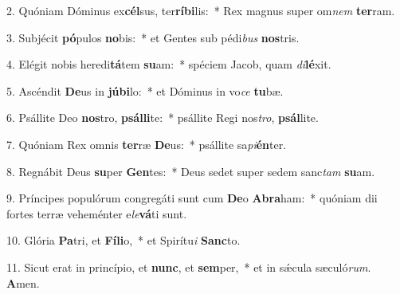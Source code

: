 2. Quóniam Dóminus ex\textbf{cél}sus, ter\textbf{rí}\textbf{bi}lis:~*  Rex magnus super om\textit{nem} \textbf{ter}ram.\

3. Subjécit \textbf{pó}pulos \textbf{no}bis:~*  et Gentes sub pédi\textit{bus} \textbf{nos}tris.\

4. Elégit nobis heredi\textbf{tá}tem \textbf{su}am:~*  spéciem Jacob, quam \textit{di}\textbf{lé}xit.\

5. Ascéndit \textbf{De}us in \textbf{jú}\textbf{bi}lo:~*  et Dóminus in vo\textit{ce} \textbf{tu}bæ.\

6. Psállite Deo \textbf{nos}tro, \textbf{psál}\textbf{li}te:~*  psállite Regi nos\textit{tro}, \textbf{psál}lite.\

7. Quóniam Rex omnis \textbf{ter}ræ \textbf{De}us:~*  psállite sa\textit{pi}\textbf{én}ter.\

8. Regnábit Deus \textbf{su}per \textbf{Gen}tes:~*  Deus sedet super sedem sanc\textit{tam} \textbf{su}am.\

9. Príncipes populórum congregáti sunt cum \textbf{De}o \textbf{A}\textbf{bra}ham:~*  quóniam dii fortes terræ veheménter e\textit{le}\textbf{vá}ti sunt.\

10. Glória \textbf{Pa}tri, et \textbf{Fí}\textbf{li}o,~*  et Spirítu\textit{i} \textbf{Sanc}to.\

11. Sicut erat in princípio, et \textbf{nunc}, et \textbf{sem}per,~*  et in sǽcula sæculó\textit{rum}. \textbf{A}men.\

